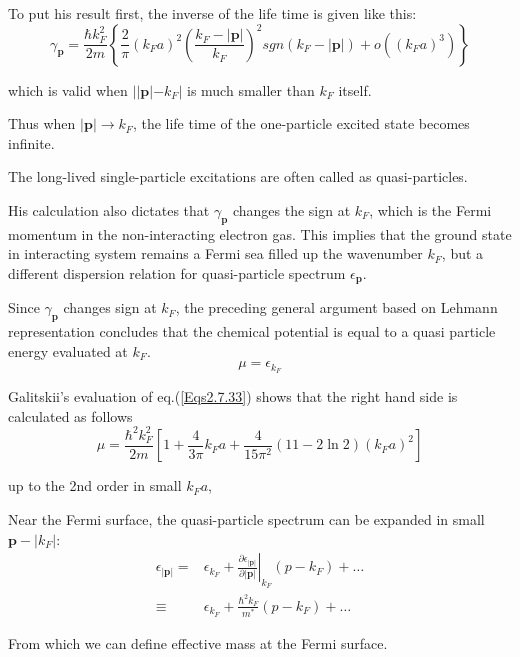 To put his result first, the inverse of the life time is given like this:
\begin{equation} \label{Eqs2.7.34}
\gamma_{\mathbf{p}} = \frac{\hbar k_F^2}{2m}\left\{ \frac{2}{\pi} (k_F a)^2 \left(\frac{k_F - |\mathbf{p}|}{k_F}\right)^2 sgn(k_F-|\mathbf{p}|) + o((k_F a)^3) \right\}
\end{equation}

which is valid when $||\mathbf{p}|-k_F|$ is much smaller than $k_F$ itself.

Thus when $|\mathbf{p}|\rightarrow k_F$, the life time of the one-particle excited state becomes infinite.

The long-lived single-particle excitations are often called as quasi-particles.

His calculation also dictates that $\gamma_\mathbf{p}$ changes the sign at $k_F$, which is the Fermi momentum in the non-interacting electron gas. This implies that the ground state in interacting system remains a Fermi sea filled up the wavenumber $k_F$, but a different dispersion relation for quasi-particle spectrum $\epsilon_{\mathbf{p}}$.

Since $\gamma_{\mathbf{p}}$ changes sign at $k_F$, the preceding general argument based on Lehmann representation concludes that the chemical potential is equal to a quasi particle energy evaluated at $k_F$.
\[ \mu=\epsilon_{k_F} \]

Galitskii's evaluation of eq.(\ref{Eqs2.7.33}) shows that the right hand side is calculated as follows
\begin{equation} \label{Eqs2.7.35}
\mu = \frac{\hbar^2 k_F^2}{2m}\left[ 1+\frac{4}{3\pi}k_F a + \frac{4}{15\pi^2}(11-2 \ln2)(k_F a)^2 \right]
\end{equation}

up to the 2nd order in small $k_F a$,

Near the Fermi surface, the quasi-particle spectrum can be expanded in small $\mathbf{p}-|k_F|$:
\begin{equation} \label{Eqs2.7.36} \begin{split}
\epsilon_{|\mathbf{p}|} =& \epsilon_{k_F} + \left. \frac{\partial \epsilon_{|\mathbf{p}|}}{\partial |\mathbf{p}|} \right|_{k_F} (p-k_F) + \ldots\\
\equiv& \epsilon_{k_F} + \frac{\hbar^2 k_F}{m^{*}} (p-k_F) + \ldots
\end{split} \end{equation}

From which we can define effective mass at the Fermi surface.

